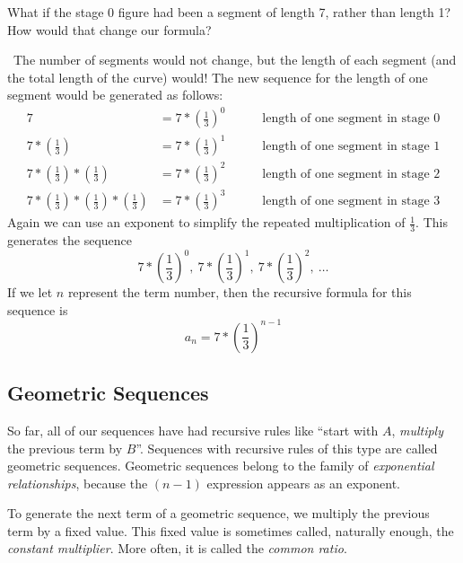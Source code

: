 \begin{boxedex}
What if the stage 0 figure had been a segment of length 7, rather than length 1? How would that change our formula?

\exsoln\ The number of segments would not change, but the length of each segment (and the total length of the curve) would! The new sequence for the length of one segment would be generated as follows:
\[\begin{aligned}
7 &=7\ast\left(\frac{1}{3}\right)^{0}
&& \quad\text{ length of one segment in stage 0}
\\
7 \ast\left(\frac{1}{3}\right) &= 7\ast\left(\frac{1}{3}\right)^{1}
&& \quad\text{ length of one segment in stage 1}
\\
7 \ast\left(\frac{1}{3}\right) \ast\left(\frac{1}{3}\right) &= 7\ast\left(\frac{1}{3}\right)^{2}
&& \quad\text{ length of one segment in stage 2}
\\
7 \ast\left(\frac{1}{3}\right) \ast\left(\frac{1}{3}\right) \ast\left(\frac{1}{3}\right) &= 7\ast\left(\frac{1}{3}\right)^{3}
&& \quad\text{ length of one segment in stage 3}
\end{aligned}\]Again we can use an exponent to simplify the repeated multiplication of $\frac{1}{3}$.
This generates the sequence
\[7\ast\left(\frac{1}{3}\right)^0, ~7\ast\left(\frac{1}{3}\right)^1, ~7\ast\left(\frac{1}{3}\right)^2, ~\dotsc\]
If we let $n$ represent the term number, then the recursive formula for this sequence is \[a_n = 7 \ast \left(\frac{1}{3}\right)^{n-1}\]
\end{boxedex}

\subsection{Geometric Sequences}

So far, all of our sequences have had recursive rules like ``start with $A$, \textit{multiply} the previous term by $B$''. Sequences with recursive rules of this type are called \glspl{geometric sequence}. Geometric sequences belong to the family of \textit{exponential relationships}, because the $(n-1)$ expression appears as an exponent.

To generate the next term of a geometric sequence, we multiply the previous term by a fixed value. This fixed value is sometimes called, naturally enough, the \textit{constant multiplier}. More often, it is called the \textit{common ratio}.

